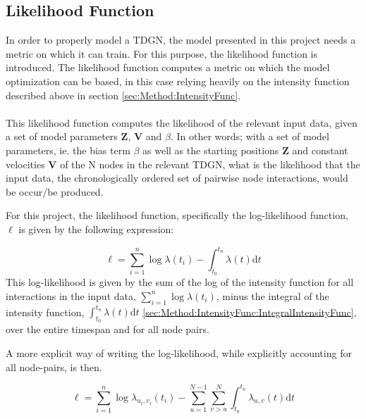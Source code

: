 \subsection{Likelihood Function}
\label{sec:Method:LikelihoodFunc}
In order to properly model a TDGN, the model presented in this project needs a metric on which it can train.
For this purpose, the likelihood function is introduced.
The likelihood function computes a metric on which the model optimization can be based, in this case relying heavily on the intensity function described above in section \ref{sec:Method:IntensityFunc}.
\\\\
This likelihood function computes the likelihood of the relevant input data, given a set of model parameters $\textbf{Z}$, $\textbf{V}$ and $\beta$.
In other words; with a set of model parameters, ie. the bias term $\beta$ as well as the starting positions $\textbf{Z}$ and constant velocities $\textbf{V}$ of the N nodes in the relevant TDGN, what is the likelihood that the input data, the chronologically ordered set of pairwise node interactions, would be occur/be produced.

For this project, the likelihood function, specifically the log-likelihood function, $\ell$ is given by the following expression:

\begin{equation}
    \ell = \sum_{i=1}^n \log \lambda (t_i) - \int_{t_0}^{t_n} \lambda(t) \mathrm{d} t
    \label{eq:LogLikelihoodFunc}
\end{equation}
This log-likelihood is given by the sum of the log of the intensity function for all interactions in the input data, $\sum_{i=1}^n \log \lambda (t_i)$, minus the integral of the intensity function, $\int_{t_0}^{t_n} \lambda(t) \mathrm{d} t$ \ref{sec:Method:IntensityFunc:IntegralIntensityFunc}, over the entire timespan and for all node pairs.

A more explicit way of writing the log-likelihood, while explicitly accounting for all node-pairs, is then.

\begin{equation}
    \ell = \sum_{i=1}^n \log \lambda_{u_i,v_i} (t_i) - \sum_{u=1}^{N-1} \sum_{v > u}^{N} \int_{t_0}^{t_n} \lambda_{u,v}(t) \mathrm{d} t
    \label{eq:LogLikelihoodFuncExplicit}
\end{equation}







